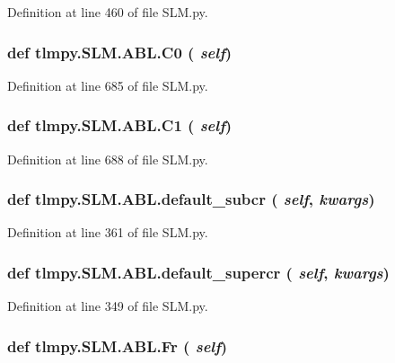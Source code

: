 Definition at line 460 of file SLM.py.\hypertarget{classtlmpy_1_1SLM_1_1ABL_aa4dd635afe05b4a3fa04ae29074fca8c}{
\subsubsection[{C0}]{\setlength{\rightskip}{0pt plus 5cm}def tlmpy.SLM.ABL.C0 ( {\em self})}}
\label{classtlmpy_1_1SLM_1_1ABL_aa4dd635afe05b4a3fa04ae29074fca8c}


Definition at line 685 of file SLM.py.\hypertarget{classtlmpy_1_1SLM_1_1ABL_a0f1161eb301426e33545fc845d62b512}{
\subsubsection[{C1}]{\setlength{\rightskip}{0pt plus 5cm}def tlmpy.SLM.ABL.C1 ( {\em self})}}
\label{classtlmpy_1_1SLM_1_1ABL_a0f1161eb301426e33545fc845d62b512}


Definition at line 688 of file SLM.py.\hypertarget{classtlmpy_1_1SLM_1_1ABL_a6f12d883cddd9eeb9df0d21b71ebaca9}{
\subsubsection[{default\_\-subcr}]{\setlength{\rightskip}{0pt plus 5cm}def tlmpy.SLM.ABL.default\_\-subcr ( {\em self}, \/   {\em kwargs})}}
\label{classtlmpy_1_1SLM_1_1ABL_a6f12d883cddd9eeb9df0d21b71ebaca9}


Definition at line 361 of file SLM.py.\hypertarget{classtlmpy_1_1SLM_1_1ABL_ac1c1c0e6ba67564475b945adfa33f870}{
\subsubsection[{default\_\-supercr}]{\setlength{\rightskip}{0pt plus 5cm}def tlmpy.SLM.ABL.default\_\-supercr ( {\em self}, \/   {\em kwargs})}}
\label{classtlmpy_1_1SLM_1_1ABL_ac1c1c0e6ba67564475b945adfa33f870}


Definition at line 349 of file SLM.py.\hypertarget{classtlmpy_1_1SLM_1_1ABL_ab2e0608547144f4ff38680a05248c0ce}{
\subsubsection[{Fr}]{\setlength{\rightskip}{0pt plus 5cm}def tlmpy.SLM.ABL.Fr ( {\em self})}}
\label{classtlmpy_1_1SLM_1_1ABL_ab2e0608547144f4ff38680a05248c0ce}


